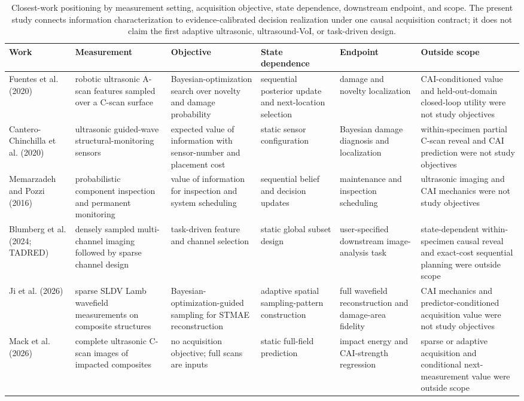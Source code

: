 \begin{table}[!tp]
\centering
\caption{Closest-work positioning by measurement setting, acquisition objective, state dependence, downstream endpoint, and scope. The present study connects information characterization to evidence-calibrated decision realization under one causal acquisition contract; it does not claim the first adaptive ultrasonic, ultrasound-VoI, or task-driven design.}
\label{tab:closest-work}
\scriptsize
\setlength{\tabcolsep}{2.8pt}
\begin{tabularx}{\textwidth}{@{}>{\RaggedRight\arraybackslash}p{}>{\RaggedRight\arraybackslash}p{}>{\RaggedRight\arraybackslash}p{}>{\RaggedRight\arraybackslash}p{}>{\RaggedRight\arraybackslash}p{}Y@{}}
\toprule
Work & Measurement & Objective & State dependence & Endpoint & Outside scope \\
\midrule
Fuentes et al. (2020) \cite{fuentes2020autonomous} & robotic ultrasonic A-scan features sampled over a C-scan surface & Bayesian-optimization search over novelty and damage probability & sequential posterior update and next-location selection & damage and novelty localization & CAI-conditioned value and held-out-domain closed-loop utility were not study objectives \\
Cantero-Chinchilla et al. (2020) \cite{cantero2020optimal} & ultrasonic guided-wave structural-monitoring sensors & expected value of information with sensor-number and placement cost & static sensor configuration & Bayesian damage diagnosis and localization & within-specimen partial C-scan reveal and CAI prediction were not study objectives \\
Memarzadeh and Pozzi (2016) \cite{memarzadeh2016value} & probabilistic component inspection and permanent monitoring & value of information for inspection and system scheduling & sequential belief and decision updates & maintenance and inspection scheduling & ultrasonic imaging and CAI mechanics were not study objectives \\
Blumberg et al. (2024; TADRED) \cite{blumberg2024experimental} & densely sampled multi-channel imaging followed by sparse channel design & task-driven feature and channel selection & static global subset design & user-specified downstream image-analysis task & state-dependent within-specimen causal reveal and exact-cost sequential planning were outside scope \\
Ji et al. (2026) \cite{ji2026adaptive} & sparse SLDV Lamb wavefield measurements on composite structures & Bayesian-optimization-guided sampling for STMAE reconstruction & adaptive spatial sampling-pattern construction & full wavefield reconstruction and damage-area fidelity & CAI mechanics and predictor-conditioned acquisition value were not study objectives \\
Mack et al. (2026) \cite{mack2026cscan} & complete ultrasonic C-scan images of impacted composites & no acquisition objective; full scans are inputs & static full-field prediction & impact energy and CAI-strength regression & sparse or adaptive acquisition and conditional next-measurement value were outside scope \\
\bottomrule
\end{tabularx}
\end{table}
